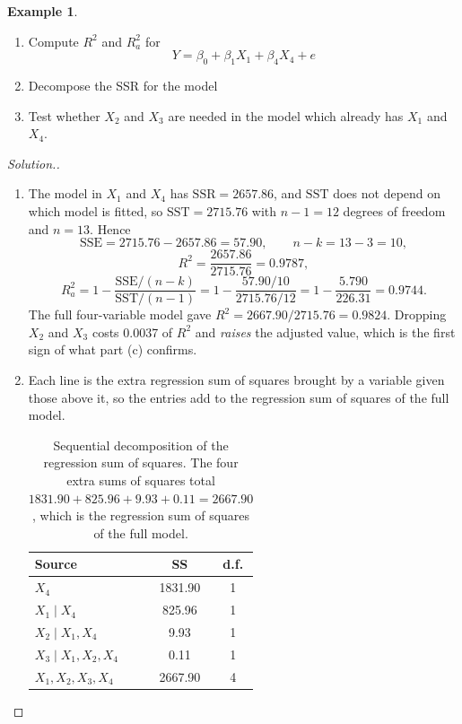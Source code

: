 \documentclass[11pt,a4paper]{article}
\theoremstyle{definition}
\newtheorem{exa}[thm]{Example}
\newenvironment{solution}
  {\renewcommand{\qedsymbol}{}\begin{proof}[\textit{Solution}.]}
  {\end{proof}}
\begin{document}
\begin{exa}
\begin{enumerate}
\begin{enumerate}
       \item Compute $R^2$ and $R^2_a$ for $$Y=\beta_0+\beta_1X_1+\beta_4X_4+e$$
       \item Decompose the SSR for the model
       \item Test whether $X_2$ and $X_3$ are needed in the model which already has $X_1$ and $X_4$.\\
\end{enumerate}





\begin{solution}
\begin{enumerate}
\item The model in $X_1$ and $X_4$ has $\text{SSR}=2657.86$, and $\text{SST}$
does not depend on which model is fitted, so $\text{SST}=2715.76$ with
$n-1=12$ degrees of freedom and $n=13$. Hence
$$\text{SSE}=2715.76-2657.86=57.90, \qquad n-k=13-3=10,$$
$$R^{2}=\frac{2657.86}{2715.76}=0.9787,$$
$$R^{2}_{a}=1-\frac{\text{SSE}/(n-k)}{\text{SST}/(n-1)}
=1-\frac{57.90/10}{2715.76/12}=1-\frac{5.790}{226.31}=0.9744.$$
The full four-variable model gave $R^{2}=2667.90/2715.76=0.9824$. Dropping
$X_2$ and $X_3$ costs 0.0037 of $R^{2}$ and \emph{raises} the adjusted value,
which is the first sign of what part (c) confirms.

\item Each line is the extra regression sum of squares brought by a variable
given those above it, so the entries add to the regression sum of squares of
the full model.

\begin{table}[H]
\centering
\begin{tabular}{|l|c|c|}
\hline
\textbf{Source} & \textbf{SS} & \textbf{d.f.}\\
\hline
$X_4$ & 1831.90 & 1\\
$X_1\mid X_4$ & 825.96 & 1\\
$X_2\mid X_1,X_4$ & 9.93 & 1\\
$X_3\mid X_1,X_2,X_4$ & 0.11 & 1\\
\hline
$X_1,X_2,X_3,X_4$ & 2667.90 & 4\\
\hline
\end{tabular}
\caption{Sequential decomposition of the regression sum of squares. The four
extra sums of squares total $1831.90+825.96+9.93+0.11=2667.90$, which is the
regression sum of squares of the full model.}
\label{tab:seqssr}
\end{table}


\end{enumerate}
\end{solution}
\end{enumerate}
\end{exa}
\end{document}
